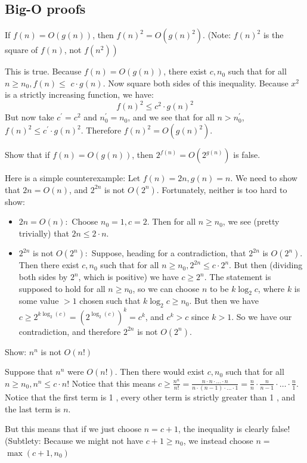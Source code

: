 \documentclass[12pt]{article}
\begin{document}
\subsection*{Big-O proofs}
If $f(n)=O(g(n))$, then $f(n)^{2}=O\left(g(n)^{2}\right)$. (Note: $f(n)^{2}$ is the square of $f(n)$, not $\left.f\left(n^{2}\right)\right)$
\begin{tcolorbox}
This is true. Because $f(n)=O(g(n))$, there exist $c, n_{0}$ such that for all $n \geq n_{0}, f(n) \leq$ $c \cdot g(n)$. Now square both sides of this inequality. Because $x^{2}$ is a strictly increasing function, we have:$$f(n)^{2} \leq c^{2} \cdot g(n)^{2}
$$
But now take $c^{\prime}=c^{2}$ and $n_{0}^{\prime}=n_{0}$, and we see that for all $n>n_{0}^{\prime}$, $f(n)^{2} \leq c^{\prime} \cdot g(n)^{2}$. Therefore $f(n)^{2}=O\left(g(n)^{2}\right)$.
\end{tcolorbox}
Show that if $f(n)=O(g(n))$, then $2^{f(n)}=O\left(2^{g(n)}\right)$ is false. 
\begin{tcolorbox} 
Here is a simple counterexample: Let $f(n)=2 n, g(n)=n$. We need to show that $2 n=O(n)$, and $2^{2 n}$ is not $O\left(2^{n}\right)$. Fortunately, neither is too hard to show:
\begin{itemize}
\item $2 n=O(n):$ Choose $n_{0}=1, c=2$. Then for all $n \geq n_{0}$, we see (pretty trivially) that $2 n \leq 2 \cdot n$.
\item $2^{2 n}$ is not $O\left(2^{n}\right):$ Suppose, heading for a contradiction, that $2^{2 n}$ is $O\left(2^{n}\right)$. Then there exist $c, n_{0}$ such that for all $n \geq n_{0}, 2^{2 n} \leq c \cdot 2^{n}$. But then (dividing both sides by $2^{n}$, which is positive) we have $c \geq 2^{n}$. The statement is supposed to hold for all $n \geq n_{0}$, so we can choose $n$ to be $k \log _{2} c$, where $k$ is some value $>1$ chosen such that $k \log _{2} c \geq n_{0}$. But then we have $c \geq 2^{k \log _{2}(c)}=\left(2^{\log _{2}(c)}\right)^{k}=c^{k}$, and $c^{k}>c$ since $k>1$. So we have our contradiction, and therefore $2^{2 n}$ is not $O\left(2^{n}\right)$.
\end{itemize}
\end{tcolorbox}
Show: $n^n$ is not $O(n!)$
\begin{tcolorbox}
Suppose that $n^{n}$ were $O(n !)$. Then there would exist $c, n_{0}$ such that for all $n \geq n_{0}, n^{n} \leq c \cdot n !$
Notice that this means $c \geq \frac{n^{n}}{n !}=\frac{n \cdot n \cdot \ldots \cdot n}{n \cdot(n-1) \cdot \ldots \cdot 1}=\frac{n}{n} \cdot \frac{n}{n-1} \cdot \ldots \cdot \frac{n}{1}$.
Notice that the first term is 1 , every other term is strictly greater than 1 , and the last term is $n$.

But this means that if we just choose $n=c+1$, the inequality is clearly false!
(Subtlety: Because we might not have $c+1 \geq n_{0}$, we instead choose $n=$ $\max \left(c+1, n_{0}\right)$
\end{tcolorbox}
\end{document}
